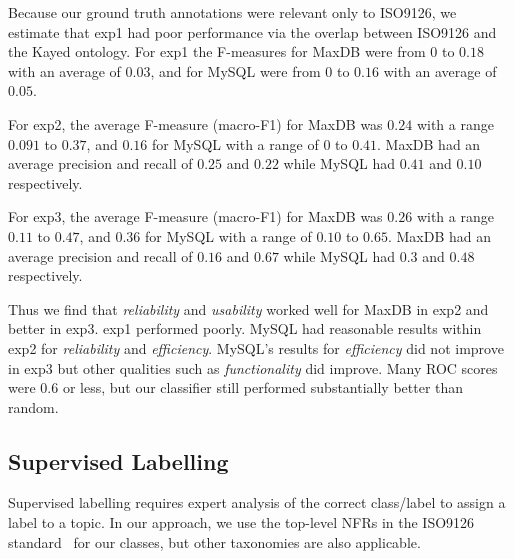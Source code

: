 \documentclass[smallextended]{svjour3}       %
\begin{document}

Because our ground truth annotations were relevant only to ISO9126,
we estimate that \textsf{exp1} had poor
performance via the overlap between ISO9126 and the Kayed ontology.
For \textsf{exp1} the F-measures for MaxDB were from $0$ to $0.18$ with an average
of $0.03$, and for MySQL were from $0$ to $0.16$ with an average of
$0.05$.


For \textsf{exp2}, the average F-measure (macro-F1) for MaxDB was $0.24$ with a range $0.091$ to
$0.37$, and $0.16$ for MySQL with a range of $0$ to $0.41$.
MaxDB had an average precision and recall of $0.25$ and $0.22$
while MySQL had $0.41$ and $0.10$ respectively.

For \textsf{exp3}, the average F-measure (macro-F1) for MaxDB was $0.26$ with a range $0.11$ to
$0.47$, and $0.36$ for MySQL with a range of $0.10$ to $0.65$.
MaxDB had an average precision and recall of $0.16$ and $0.67$
while MySQL had $0.3$ and $0.48$ respectively.

Thus we find that \emph{reliability} and
\emph{usability} worked well for MaxDB in \textsf{exp2} and better in
\textsf{exp3}. 
\textsf{exp1} performed poorly.
MySQL had reasonable results within \textsf{exp2} for \emph{reliability} and \emph{efficiency}. 
MySQL's results for \emph{efficiency} did not improve in \textsf{exp3}
but other qualities such as \emph{functionality} did improve. 
Many ROC scores were $0.6$ or less, but our classifier still performed substantially better than random.

\subsection{Supervised Labelling}
\label{sec:suplabelling}
Supervised labelling requires expert analysis of the correct
class/label to assign a label to a topic. In our approach, we use the top-level NFRs in the ISO9126 standard~\cite{iso9126} for our classes, but other
taxonomies are also applicable.%
\end{document}
